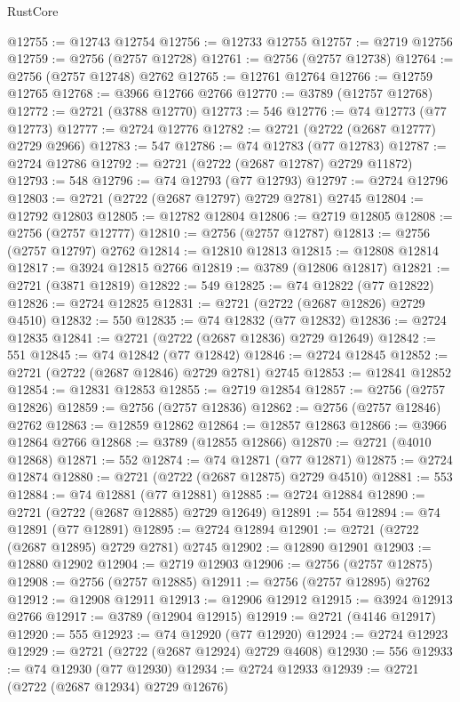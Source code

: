 \begin{lexlean}{RustCore}
\begin{coremodule}
@12755 := @12743 @12754
@12756 := @12733 @12755
@12757 := @2719 @12756
@12759 := @2756 (@2757 @12728)
@12761 := @2756 (@2757 @12738)
@12764 := @2756 (@2757 @12748) @2762
@12765 := @12761 @12764
@12766 := @12759 @12765
@12768 := @3966 @12766 @2766
@12770 := @3789 (@12757 @12768)
@12772 := @2721 (@3788 @12770)
@12773 := 546
@12776 := @74 @12773 (@77 @12773)
@12777 := @2724 @12776
@12782 := @2721 (@2722 (@2687 @12777) @2729 @2966)
@12783 := 547
@12786 := @74 @12783 (@77 @12783)
@12787 := @2724 @12786
@12792 := @2721 (@2722 (@2687 @12787) @2729 @11872)
@12793 := 548
@12796 := @74 @12793 (@77 @12793)
@12797 := @2724 @12796
@12803 := @2721 (@2722 (@2687 @12797) @2729 @2781) @2745
@12804 := @12792 @12803
@12805 := @12782 @12804
@12806 := @2719 @12805
@12808 := @2756 (@2757 @12777)
@12810 := @2756 (@2757 @12787)
@12813 := @2756 (@2757 @12797) @2762
@12814 := @12810 @12813
@12815 := @12808 @12814
@12817 := @3924 @12815 @2766
@12819 := @3789 (@12806 @12817)
@12821 := @2721 (@3871 @12819)
@12822 := 549
@12825 := @74 @12822 (@77 @12822)
@12826 := @2724 @12825
@12831 := @2721 (@2722 (@2687 @12826) @2729 @4510)
@12832 := 550
@12835 := @74 @12832 (@77 @12832)
@12836 := @2724 @12835
@12841 := @2721 (@2722 (@2687 @12836) @2729 @12649)
@12842 := 551
@12845 := @74 @12842 (@77 @12842)
@12846 := @2724 @12845
@12852 := @2721 (@2722 (@2687 @12846) @2729 @2781) @2745
@12853 := @12841 @12852
@12854 := @12831 @12853
@12855 := @2719 @12854
@12857 := @2756 (@2757 @12826)
@12859 := @2756 (@2757 @12836)
@12862 := @2756 (@2757 @12846) @2762
@12863 := @12859 @12862
@12864 := @12857 @12863
@12866 := @3966 @12864 @2766
@12868 := @3789 (@12855 @12866)
@12870 := @2721 (@4010 @12868)
@12871 := 552
@12874 := @74 @12871 (@77 @12871)
@12875 := @2724 @12874
@12880 := @2721 (@2722 (@2687 @12875) @2729 @4510)
@12881 := 553
@12884 := @74 @12881 (@77 @12881)
@12885 := @2724 @12884
@12890 := @2721 (@2722 (@2687 @12885) @2729 @12649)
@12891 := 554
@12894 := @74 @12891 (@77 @12891)
@12895 := @2724 @12894
@12901 := @2721 (@2722 (@2687 @12895) @2729 @2781) @2745
@12902 := @12890 @12901
@12903 := @12880 @12902
@12904 := @2719 @12903
@12906 := @2756 (@2757 @12875)
@12908 := @2756 (@2757 @12885)
@12911 := @2756 (@2757 @12895) @2762
@12912 := @12908 @12911
@12913 := @12906 @12912
@12915 := @3924 @12913 @2766
@12917 := @3789 (@12904 @12915)
@12919 := @2721 (@4146 @12917)
@12920 := 555
@12923 := @74 @12920 (@77 @12920)
@12924 := @2724 @12923
@12929 := @2721 (@2722 (@2687 @12924) @2729 @4608)
@12930 := 556
@12933 := @74 @12930 (@77 @12930)
@12934 := @2724 @12933
@12939 := @2721 (@2722 (@2687 @12934) @2729 @12676)

\end{coremodule}
\end{lexlean}
